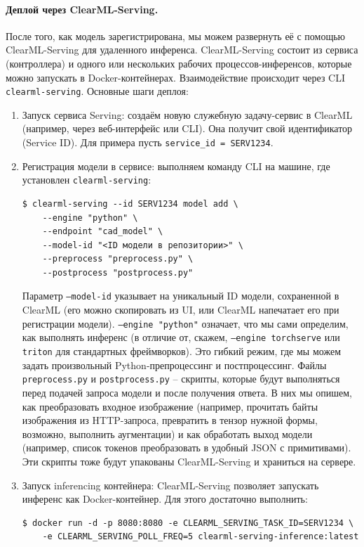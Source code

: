 \documentclass{article}
\begin{document}
\paragraph{Деплой через ClearML-Serving.} После того, как модель зарегистрирована, мы можем развернуть её с помощью ClearML-Serving для удаленного инференса. ClearML-Serving состоит из сервиса (контроллера) и одного или нескольких рабочих процессов-инференсов, которые можно запускать в Docker-контейнерах. Взаимодействие происходит через CLI \texttt{clearml-serving}. Основные шаги деплоя:
\begin{enumerate}
\item Запуск сервиса Serving: создаём новую служебную задачу-сервис в ClearML (например, через веб-интерфейс или CLI). Она получит свой идентификатор (Service ID). Для примера пусть \texttt{service_id = SERV1234}.
\item Регистрация модели в сервисе: выполняем команду CLI на машине, где установлен \texttt{clearml-serving}:
\begin{verbatim}
$ clearml-serving --id SERV1234 model add \
    --engine "python" \
    --endpoint "cad_model" \
    --model-id "<ID модели в репозитории>" \
    --preprocess "preprocess.py" \
    --postprocess "postprocess.py"
\end{verbatim}
Параметр \texttt{--model-id} указывает на уникальный ID модели, сохраненной в ClearML (его можно скопировать из UI, или ClearML напечатает его при регистрации модели). \texttt{--engine "python"} означает, что мы сами определим, как выполнять инференс (в отличие от, скажем, \texttt{--engine torchserve} или \texttt{triton} для стандартных фреймворков). Это гибкий режим, где мы можем задать произвольный Python-препроцессинг и постпроцессинг. Файлы \texttt{preprocess.py} и \texttt{postprocess.py} – скрипты, которые будут выполняться перед подачей запроса модели и после получения ответа. В них мы опишем, как преобразовать входное изображение (например, прочитать байты изображения из HTTP-запроса, превратить в тензор нужной формы, возможно, выполнить аугментации) и как обработать выход модели (например, список токенов преобразовать в удобный JSON с примитивами). Эти скрипты тоже будут упакованы ClearML-Serving и храниться на сервере.
\item Запуск inferencing контейнера: ClearML-Serving позволяет запускать инференс как Docker-контейнер. Для этого достаточно выполнить:
\begin{verbatim}
$ docker run -d -p 8080:8080 -e CLEARML_SERVING_TASK_ID=SERV1234 \
    -e CLEARML_SERVING_POLL_FREQ=5 clearml-serving-inference:latest

\end{verbatim}
\end{enumerate}
\end{document}

